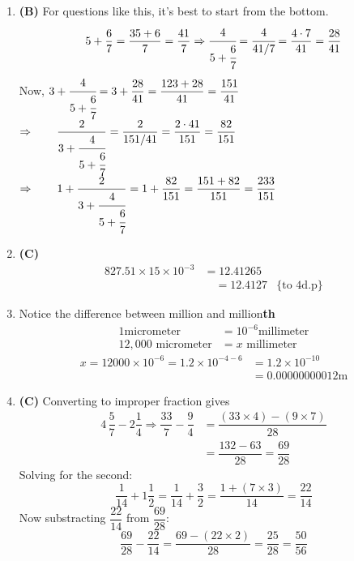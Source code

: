 \begin{multicols}{2}
\begin{enumerate}[label={\arabic*.}]
    \item \textbf{(B)} For questions like this, it's best to start from the bottom.
    \[5 + \dfrac{6}{7} = \dfrac{35 + 6}{7} = \dfrac{41}{7} \Rightarrow \cfrac{4}{5 + \cfrac{6}{7}} = \cfrac{4}{41/7} = \dfrac{4 \cdot 7}{41} = \dfrac{28}{41}\]
    Now, \(3 + \cfrac{4}{5 + \cfrac{6}{7}} = 3 + \dfrac{28}{41} = \dfrac{123 + 28}{41} = \dfrac{151}{41}\)
    \vspace{10pt}
    \(\Rightarrow \hspace{20px} \dfrac{2}{3 + \cfrac{4}{5 + \cfrac{6}{7}}} = \dfrac{2}{151/41} = \dfrac{2 \cdot 41}{151} = \dfrac{82}{151}\)
    \vspace{10pt}
    \(\Rightarrow \hspace{20px} 1 + \dfrac{2}{3 + \cfrac{4}{5 + \cfrac{6}{7}}} = 1 + \dfrac{82}{151} = \dfrac{151 + 82}{151} = \dfrac{233}{151}\)
    
    \item \textbf{(C)}\begin{align*}
        827.51 \times 15 \times 10^{-3} &= 12.41265 \\
        &\quad = 12.4127  &\text{\{ to 4d.p\}}
        \end{align*}
    \item Notice the difference between million and million\textbf{th} 
    \begin{align*}
     1 \text{micrometer} &= 10^{-6}\text{millimeter} \\
    12,000 \text{ micrometer} &= x \text{ millimeter} 
    \end{align*}
    \begin{align*}
    x = 12000 \times 10^{-6}  = 1.2 \times 10^{-4 -6 } &= 1.2 \times 10^{-10} \\ &= 0.00000000012 \textrm{m}
    \end{align*}

    \item \textbf{(C)} Converting to improper fraction gives 
        \begin{align*}
        4\,\dfrac{5}{7} - 2\dfrac{1}{4} \Rightarrow \dfrac{33}{7} - \dfrac{9}{4} &= \dfrac{(33\times 4) - (9 \times 7) }{28}  \\
        &= \dfrac{132 - 63}{28} = \dfrac{69}{28} 
        \end{align*}
        Solving for the second:
        \[\dfrac{1}{14} + 1\dfrac{1}{2} = \dfrac{1}{14} + \dfrac{3}{2} = \dfrac{1 + (7 \times 3)}{14} = \dfrac{22}{14}\] 
        Now substracting $\dfrac{22}{14}$ from $\dfrac{69}{28}$: 
        \[\dfrac{69}{28} - \dfrac{22}{14} = \dfrac{69 - (22 \times 2)}{28} =  \dfrac{25}{28} = \dfrac{50}{56}\]


\end{enumerate}
\end{multicols}

